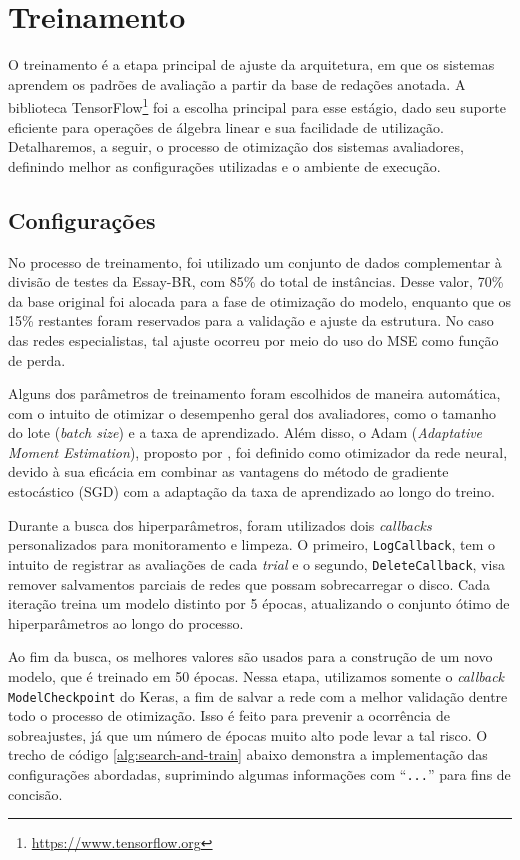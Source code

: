 \section{Treinamento}

O treinamento é a etapa principal de ajuste da arquitetura, em que os sistemas aprendem os padrões de avaliação a partir da base de redações anotada. A biblioteca TensorFlow\footnote{\url{https://www.tensorflow.org}} foi a escolha principal para esse estágio, dado seu suporte eficiente para operações de álgebra linear e sua facilidade de utilização. Detalharemos, a seguir, o processo de otimização dos sistemas avaliadores, definindo melhor as configurações utilizadas e o ambiente de execução.

\subsection{Configurações}

No processo de treinamento, foi utilizado um conjunto de dados complementar à divisão de testes da Essay-BR, com 85\% do total de instâncias. Desse valor, 70\% da base original foi alocada para a fase de otimização do modelo, enquanto que os 15\% restantes foram reservados para a validação e ajuste da estrutura. No caso das redes especialistas, tal ajuste ocorreu por meio do uso do MSE como função de perda.

Alguns dos parâmetros de treinamento foram escolhidos de maneira automática, com o intuito de otimizar o desempenho geral dos avaliadores, como o tamanho do lote (\textit{batch size}) e a taxa de aprendizado. Além disso, o Adam (\textit{Adaptative Moment Estimation}), proposto por \citet{kingma2017adam}, foi definido como otimizador da rede neural, devido à sua eficácia em combinar as vantagens do método de gradiente estocástico (SGD) com a adaptação da taxa de aprendizado ao longo do treino.

Durante a busca dos hiperparâmetros, foram utilizados dois \textit{callbacks} personalizados para monitoramento e limpeza. O primeiro, \texttt{LogCallback}, tem o intuito de registrar as avaliações de cada \textit{trial} e o segundo, \texttt{DeleteCallback}, visa remover salvamentos parciais de redes que possam sobrecarregar o disco. Cada iteração treina um modelo distinto por 5 épocas, atualizando o conjunto ótimo de hiperparâmetros ao longo do processo.

Ao fim da busca, os melhores valores são usados para a construção de um novo modelo, que é treinado em 50 épocas. Nessa etapa, utilizamos somente o \textit{callback} \texttt{ModelCheckpoint} do Keras, a fim de salvar a rede com a melhor validação dentre todo o processo de otimização. Isso é feito para prevenir a ocorrência de sobreajustes, já que um número de épocas muito alto pode levar a tal risco. O trecho de código \ref{alg:search-and-train} abaixo demonstra a implementação das configurações abordadas, suprimindo algumas informações com ``\texttt{...}'' para fins de concisão.

